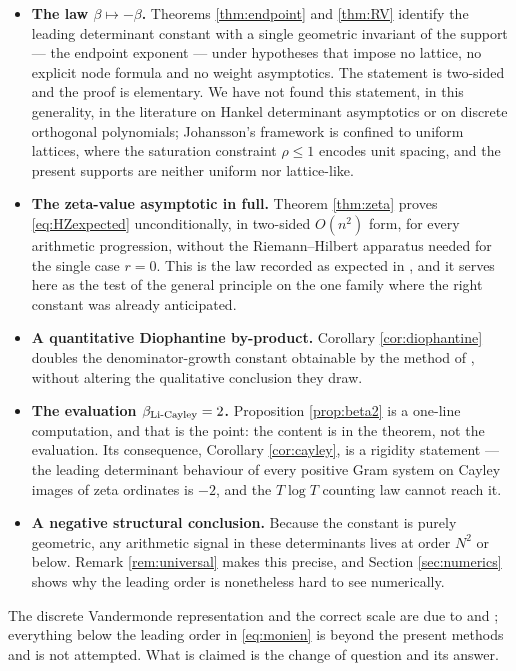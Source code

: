 \documentclass[11pt]{amsart}
\numberwithin{equation}{section}
\theoremstyle{plain}
\theoremstyle{definition}
\theoremstyle{remark}
\begin{document}
\begin{itemize}
\item \textbf{The law $\beta\mapsto-\beta$.} Theorems \ref{thm:endpoint} and \ref{thm:RV} identify
the leading determinant constant with a single geometric invariant of the support --- the endpoint
exponent --- under hypotheses that impose no lattice, no explicit node formula and no weight
asymptotics. The statement is two-sided and the proof is elementary. We have not found this
statement, in this generality, in the literature on Hankel determinant asymptotics or on discrete
orthogonal polynomials; Johansson's framework is confined to uniform lattices, where the saturation
constraint $\rho\le1$ encodes unit spacing, and the present supports are neither uniform nor
lattice-like.
\item \textbf{The zeta-value asymptotic in full.} Theorem \ref{thm:zeta} proves
\eqref{eq:HZexpected} unconditionally, in two-sided $O(n^{2})$ form, for every arithmetic
progression, without the Riemann--Hilbert apparatus needed for the single case $r=0$. This is the
law recorded as expected in \cite{HaynesZudilin2015}, and it serves here as the test of the general
principle on the one family where the right constant was already anticipated.
\item \textbf{A quantitative Diophantine by-product.} Corollary \ref{cor:diophantine} doubles the
denominator-growth constant obtainable by the method of \cite{HaynesZudilin2015}, without altering
the qualitative conclusion they draw.
\item \textbf{The evaluation $\beta_{\mathrm{Li\text-Cayley}}=2$.} Proposition \ref{prop:beta2} is a
one-line computation, and that is the point: the content is in the theorem, not the evaluation. Its
consequence, Corollary \ref{cor:cayley}, is a rigidity statement --- the leading determinant
behaviour of every positive Gram system on Cayley images of zeta ordinates is $-2$, and the
$T\log T$ counting law cannot reach it.
\item \textbf{A negative structural conclusion.} Because the constant is purely geometric, any
arithmetic signal in these determinants lives at order $N^{2}$ or below. Remark \ref{rem:universal}
makes this precise, and Section \ref{sec:numerics} shows why the leading order is nonetheless hard
to see numerically.
\end{itemize}

The discrete Vandermonde representation and the correct scale are due to \cite{Monien2009} and
\cite{HaynesZudilin2015}; everything below the leading order in \eqref{eq:monien} is beyond the
present methods and is not attempted. What is claimed is the change of question and its answer.
\end{document}
